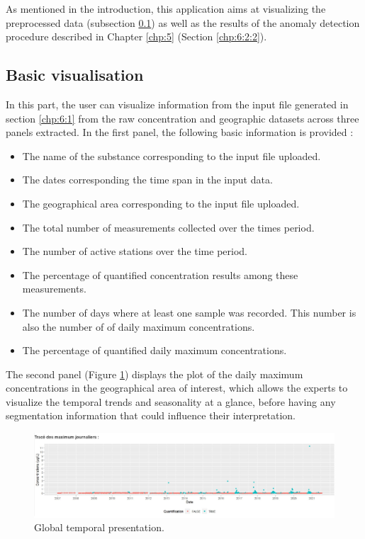 As mentioned in the introduction, this application aims at visualizing the preprocessed data (subsection \ref{chp:6:2:1}) as well as the results of the anomaly detection procedure described in Chapter \ref{chp:5} (Section \ref{chp:6:2:2}). 

\subsection{Basic visualisation}\label{chp:6:2:1}

  

In this part, the user can visualize information from the input file generated in section \ref{chp:6:1} from the raw concentration and geographic datasets across three panels  extracted. 
In the first panel, the following basic information is provided :

\begin{itemize}
\item The name of the substance corresponding to the input file uploaded.
\item The dates corresponding the time span in the input data.
\item The geographical area corresponding to the input file uploaded.
\item The total number of measurements collected over the times period.
\item The number of active stations over the time period.
\item The percentage of quantified concentration results among these measurements. 
\item The number of days where at least one sample was recorded. This number is also the number of of daily maximum concentrations. 
\item The percentage of quantified daily maximum concentrations.
\end{itemize}

The second panel (Figure \ref{fig:Imapp1}) displays the plot of the daily maximum concentrations in the geographical area of interest, which allows the experts to visualize the temporal trends and seasonality at a glance, before having any segmentation information that could influence their interpretation.

\begin{figure}[htbp]
  \centering
  \includegraphics[]{figs/Chap6/Im_app1.pdf}
  \caption{Global temporal presentation.}
  \label{fig:Imapp1}
\end{figure}

